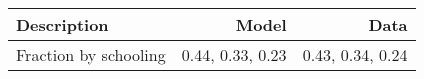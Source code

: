 \begin{tabular}{lrr}
\hline
Description & Model  & Data  \\ 
\hline
Fraction by schooling & 0.44, 0.33, 0.23  & 0.43, 0.34, 0.24  \\ 
\hline
\end{tabular}%
